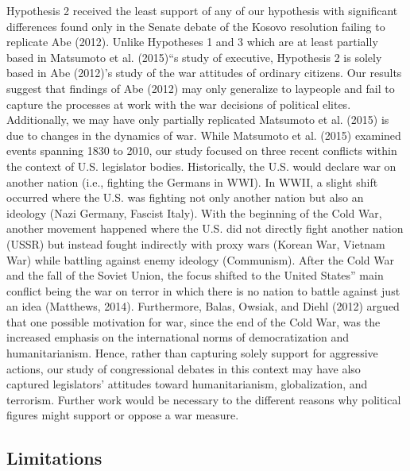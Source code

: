 \documentclass[english,,man,floatsintext]{apa6}
\begin{document}
Hypothesis 2 received the least support of any of our hypothesis with significant differences found only in the Senate debate of the Kosovo resolution failing to replicate Abe (2012). Unlike Hypotheses 1 and 3 which are at least partially based in Matsumoto et al. (2015)\enquote{s study of executive, Hypothesis 2 is solely based in Abe (2012)'s study of the war attitudes of ordinary citizens. Our results suggest that findings of Abe (2012) may only generalize to laypeople and fail to capture the processes at work with the war decisions of political elites.
Additionally, we may have only partially replicated Matsumoto et al. (2015) is due to changes in the dynamics of war. While Matsumoto et al. (2015) examined events spanning 1830 to 2010, our study focused on three recent conflicts within the context of U.S. legislator bodies. Historically, the U.S. would declare war on another nation (i.e., fighting the Germans in WWI). In WWII, a slight shift occurred where the U.S. was fighting not only another nation but also an ideology (Nazi Germany, Fascist Italy). With the beginning of the Cold War, another movement happened where the U.S. did not directly fight another nation (USSR) but instead fought indirectly with proxy wars (Korean War, Vietnam War) while battling against enemy ideology (Communism). After the Cold War and the fall of the Soviet Union, the focus shifted to the United States} main conflict being the war on terror in which there is no nation to battle against just an idea (Matthews, 2014). Furthermore, Balas, Owsiak, and Diehl (2012) argued that one possible motivation for war, since the end of the Cold War, was the increased emphasis on the international norms of democratization and humanitarianism. Hence, rather than capturing solely support for aggressive actions, our study of congressional debates in this context may have also captured legislators' attitudes toward humanitarianism, globalization, and terrorism. Further work would be necessary to the different reasons why political figures might support or oppose a war measure.

\hypertarget{limitations}{%
\subsection{Limitations}\label{limitations}}
\end{document}
